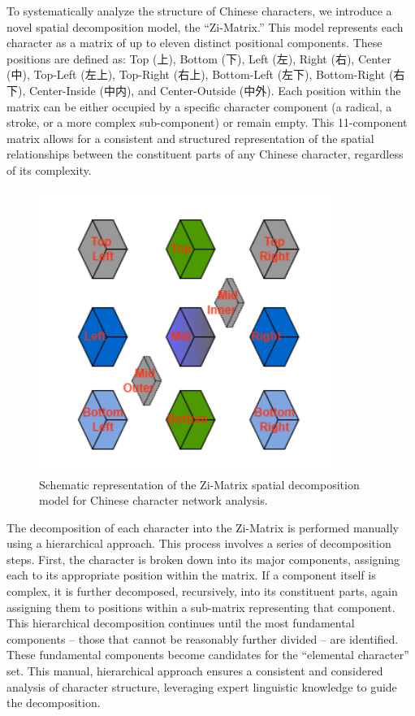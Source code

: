 \documentclass[11pt,letterpaper]{article}
\begin{document}
To systematically analyze the structure of Chinese characters, we
introduce a novel spatial decomposition model, the ``Zi-Matrix.'' This
model represents each character as a matrix of up to eleven distinct
positional components. These positions are defined as: Top (上), Bottom
(下), Left (左), Right (右), Center (中), Top-Left (左上), Top-Right
(右上), Bottom-Left (左下), Bottom-Right (右下), Center-Inside (中内),
and Center-Outside (中外). Each position within the matrix can be either
occupied by a specific character component (a radical, a stroke, or a
more complex sub-component) or remain empty. This 11-component matrix
allows for a consistent and structured representation of the spatial
relationships between the constituent parts of any Chinese character,
regardless of its complexity.

\begin{figure}
\centering
\includegraphics[width=0.85\textwidth]{./images/zi-matrix.png}
\caption{Schematic representation of the Zi-Matrix spatial decomposition
model for Chinese character network analysis.}
\end{figure}

The decomposition of each character into the Zi-Matrix is performed
manually using a hierarchical approach. This process involves a series
of decomposition steps. First, the character is broken down into its
major components, assigning each to its appropriate position within the
matrix. If a component itself is complex, it is further decomposed,
recursively, into its constituent parts, again assigning them to
positions within a sub-matrix representing that component. This
hierarchical decomposition continues until the most fundamental
components -- those that cannot be reasonably further divided -- are
identified. These fundamental components become candidates for the
``elemental character'' set. This manual, hierarchical approach ensures
a consistent and considered analysis of character structure, leveraging
expert linguistic knowledge to guide the decomposition.
\end{document}
